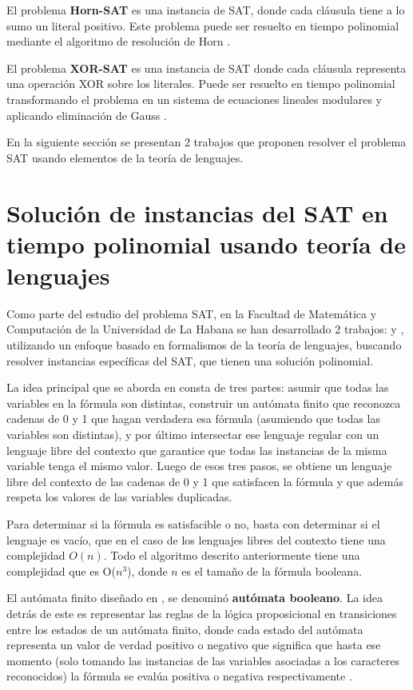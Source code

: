 \documentclass[12pt]{article}
\begin{document}
El problema \textbf{Horn-SAT} es una instancia de SAT, donde cada cláusula tiene a lo sumo un literal positivo.  Este problema puede ser resuelto en tiempo polinomial mediante el algoritmo de resolución de Horn \cite{hornsatbib}.

El problema \textbf{XOR-SAT} es una instancia de SAT donde cada cláusula representa una operación XOR sobre los literales. Puede ser resuelto en tiempo polinomial transformando el problema en un sistema de ecuaciones lineales modulares y aplicando eliminación de Gauss \cite{xorsatbib}.

En la siguiente sección se presentan 2 trabajos que proponen resolver el problema SAT usando elementos de la teoría de lenguajes.

\section{Solución de instancias del SAT en tiempo polinomial usando teoría de lenguajes}

Como parte del estudio del problema SAT, en la Facultad de Matemática y Computación de la Universidad de La Habana
se han desarrollado 2 trabajos: \cite{aCFSAT} y \cite{aSRCSAT}, utilizando un enfoque basado en formalismos de la teoría de lenguajes, buscando resolver 
instancias específicas del SAT, que tienen una solución polinomial.

La idea principal que se aborda en \cite{aCFSAT} consta de tres partes: asumir que todas las variables en la fórmula son distintas, construir un autómata finito que reconozca cadenas de 0 y 1 que hagan verdadera esa fórmula (asumiendo que todas las variables son distintas), y por último intersectar ese lenguaje regular con un lenguaje libre del contexto que garantice que todas las instancias de la misma variable tenga el mismo valor. Luego de esos tres pasos, se obtiene un lenguaje libre del contexto de las cadenas de 0 y 1 que satisfacen la fórmula y que además respeta los valores de las variables duplicadas.

Para determinar si la fórmula es satisfacible o no, basta con determinar si el lenguaje es vacío, que en el caso de los lenguajes libres del contexto tiene una complejidad $O(n)$. Todo el algoritmo descrito anteriormente tiene una complejidad que es O($n^3$), donde $n$ es el tamaño de la fórmula booleana.

El autómata finito diseñado en \cite{aCFSAT}, se denominó \textbf{autómata booleano}. La idea detrás de este es representar las reglas de la lógica proposicional en transiciones entre los estados de un autómata finito, donde cada estado del autómata representa un valor de verdad positivo o negativo que significa que hasta ese momento (solo tomando las instancias de las variables asociadas a los caracteres reconocidos) la fórmula se evalúa positiva o negativa respectivamente \cite{aCFSAT}.
\end{document}
